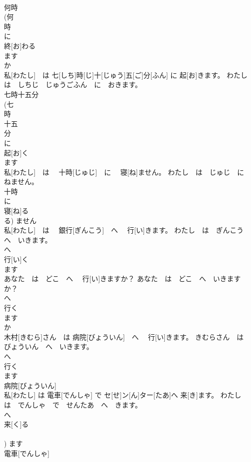 \documentclass[8pt]{extreport}
\begin{document}
\begin{CJK}{UTF8}{min}
\\	何時 
\\	(何 
\\	時 
\\	に 
\\	終[お]わる 
\\	ます 
\\	か 
\\	私[わたし]　は 七[しち]時[じ]十[じゅう]五[ご]分[ふん] に 起[お]きます。	わたし　は　しちじ　じゅうごふん　に　おきます。	
\\	七時十五分　
\\	(七 
\\	時 
\\	十五 
\\	分 
\\	に 
\\	起[お]く 
\\	ます 
\\	私[わたし]　は　 十時[じゅじ]　に　 寝[ね]ません。	わたし　は　じゅじ　に　ねません。	
\\	十時 
\\	に 
\\	寝[ね]る 
\\	る)	ません 
\\	私[わたし]　は　 銀行[ぎんこう]　へ　 行[い]きます。	わたし　は　ぎんこう　へ　いきます。	
\\	へ 
\\	行[い]く 
\\	ます 
\\	あなた　は　どこ　へ　 行[い]きますか？	あなた　は　どこ　へ　いきますか？	
\\	へ 
\\	行く 
\\	ます 
\\	か 
\\	木村[きむら]さん　は 病院[びょういん]　へ　 行[い]きます。	きむらさん　は　びょういん　へ　いきます。	
\\	へ 
\\	行く 
\\	ます 
\\	病院[びょういん] 
\\	私[わたし] は 電車[でんしゃ] で セ[せ]ン[ん]ター[たあ]へ 来[き]ます。	わたし　は　でんしゃ　で　せんたあ　へ　きます。	
\\	へ 
\\	来[く]る 
\\	[くる] 
\\	[き])	ます 
\\	電車[でんしゃ] 

\end{CJK}
\end{document}
